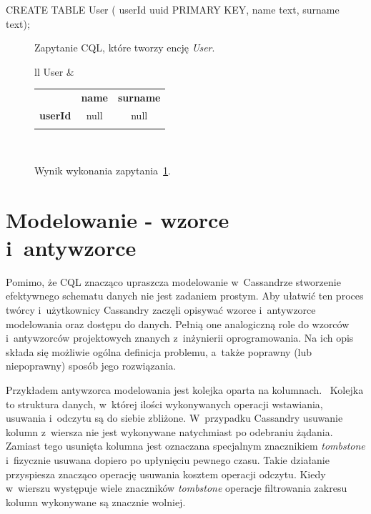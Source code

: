 \begin{verbbox}
	CREATE TABLE User (
	    userId uuid PRIMARY KEY,
	    name text,
	    surname text);
\end{verbbox}

\begin{figure}[ht!]
	\centering
	\theverbbox

	\caption{Zapytanie CQL, które tworzy encję \emph{User}.}
	\label{lst:cql_example}
\end{figure}

\begin{figure}[ht!]
	\centering

	\begin{tabular}{ll}
		User &
		\begin{tabular}{|l||c|c|}
			\hhline{|-||--|}
			 & \textbf{name} & \textbf{surname} \\
			\hhline{|~||==|}
			\textbf{userId} & null & null \\
			\hhline{|-||--|}
		\end{tabular} \\
	\end{tabular}

	\caption{Wynik wykonania zapytania~\ref{lst:cql_example}.}
	\label{tab:cql_example_query_result}
\end{figure}

\section{Modelowanie - wzorce i~antywzorce}
\label{sec:patterns_and_antipatterns}

Pomimo, że CQL znacząco upraszcza modelowanie w~Cassandrze stworzenie efektywnego schematu danych nie jest zadaniem prostym. Aby ułatwić ten proces twórcy i~użytkownicy Cassandry zaczęli opisywać wzorce i~antywzorce modelowania oraz dostępu do danych. Pełnią one analogiczną role do wzorców i~antywzorców projektowych znanych z~inżynierii oprogramowania. Na ich opis składa się możliwie ogólna definicja problemu, a~także poprawny (lub niepoprawny) sposób jego rozwiązania. 

Przykładem antywzorca modelowania jest kolejka oparta na kolumnach.~\cite{cassandra_queue_antipattern} Kolejka to struktura danych, w~której ilości wykonywanych operacji wstawiania, usuwania i~odczytu są do siebie zbliżone. W~przypadku Cassandry usuwanie kolumn z~wiersza nie jest wykonywane natychmiast po odebraniu żądania. Zamiast tego usunięta kolumna jest oznaczana specjalnym znacznikiem \emph{tombstone} i~fizycznie usuwana dopiero po upłynięciu pewnego czasu. Takie działanie przyspiesza znacząco operację usuwania kosztem operacji odczytu. Kiedy w~wierszu występuje wiele znaczników \emph{tombstone} operacje filtrowania zakresu kolumn wykonywane są znacznie wolniej.


